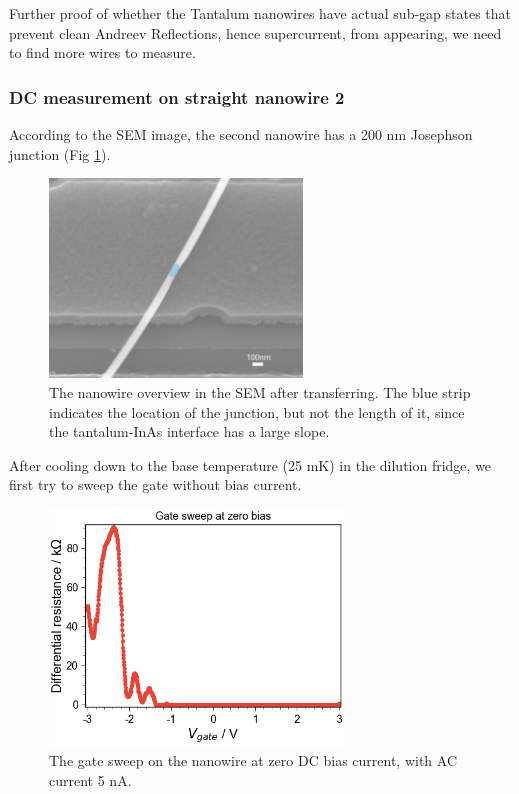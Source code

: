 Further proof of whether the Tantalum nanowires have actual sub-gap states that prevent clean Andreev Reflections, hence supercurrent, from appearing, we need to find more wires to measure.

\subsubsection{DC measurement on straight nanowire 2}
According to the SEM image, the second nanowire has a 200 nm Josephson junction (Fig \ref{NW2}). 
\begin{figure}[h!]
    \centering
    \includegraphics[width=0.6\textwidth]{Pic/D3.jpg}
    \caption{The nanowire overview in the SEM after transferring. The blue strip indicates the location of the junction, but not the length of it, since the tantalum-InAs interface has a large slope. }
    \label{NW2}
\end{figure}

After cooling down to the base temperature (25 mK) in the dilution fridge, we first try to sweep the gate without bias current.
\begin{figure}[h!]
    \centering
    \includegraphics[width=0.7\textwidth]{Pic/D3_gatesweep.png}
    \caption{The gate sweep on the nanowire at zero DC bias current, with AC current 5 nA.}
    \label{fig:my_label}
\end{figure}

